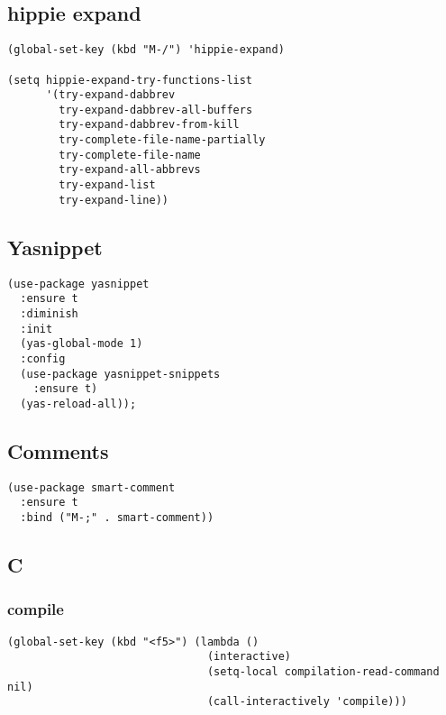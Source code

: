 \documentclass[12pt]{article}
\begin{document}
\subsection{hippie expand}
\label{sec:orgca17fef}


\begin{verbatim}
(global-set-key (kbd "M-/") 'hippie-expand)

(setq hippie-expand-try-functions-list
      '(try-expand-dabbrev
        try-expand-dabbrev-all-buffers
        try-expand-dabbrev-from-kill
        try-complete-file-name-partially
        try-complete-file-name
        try-expand-all-abbrevs
        try-expand-list
        try-expand-line))
\end{verbatim}

\subsection{Yasnippet}
\label{sec:org3bca3d8}

\begin{verbatim}
(use-package yasnippet
  :ensure t
  :diminish
  :init
  (yas-global-mode 1)
  :config
  (use-package yasnippet-snippets
    :ensure t)
  (yas-reload-all));
\end{verbatim}

\subsection{Comments}
\label{sec:orgd101916}
\begin{verbatim}
(use-package smart-comment
  :ensure t
  :bind ("M-;" . smart-comment))
\end{verbatim}

\subsection{C}
\label{sec:org59716f6}
\subsubsection{compile}
\label{sec:org158cbe8}

\begin{verbatim}
(global-set-key (kbd "<f5>") (lambda ()
                               (interactive)
                               (setq-local compilation-read-command nil)
                               (call-interactively 'compile)))

\end{verbatim}
\end{document}
